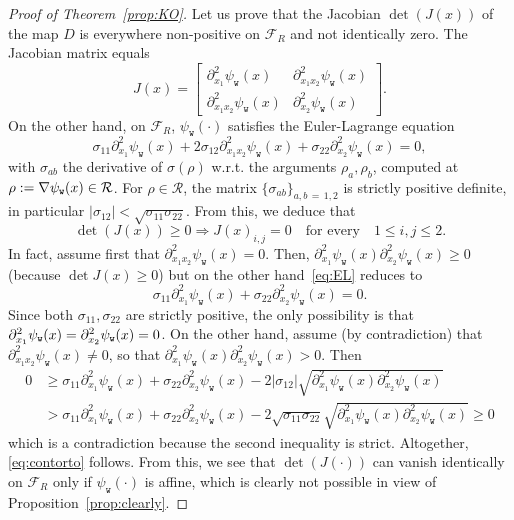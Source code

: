 \documentclass[10pt]{amsart}
\theoremstyle{definition}\newtheorem{defi}[theo]{Definition}\newtheorem{rema}[theo]{Remark}\newtheorem{exam}[theo]{Example}\newtheorem{exem}[theo]{Example}\newtheorem{nota}[theo]{Notation}
\newcommand{\ttw}{\mathtt{w}}
\newcommand{\clR}{\mathcal{R}}
\newcommand{\clF}{\mathcal{F}}
\begin{document}
\begin{proof}[Proof of Theorem~\ref{prop:KO}]
Let us prove that the Jacobian $\det(J(x))$ of the map $D $ is everywhere non-positive on $\clF_R$ and not identically zero. The Jacobian matrix equals
\begin{equation}\label{eq:J}
J(x)=
\begin{bmatrix}
\partial^2_{x_1}\psi_{\ttw}(x)&\partial^2_{x_1 x_2}\psi_{\ttw}(x)\\[0.10em]
\partial^2_{x_1 x_2}\psi_{\ttw}(x)&\partial^2_{x_2}\psi_{\ttw}(x)
\end{bmatrix}.
\end{equation}
On the other hand, on $\clF_R$, $\psi_{\ttw}(\cdot)$ satisfies the Euler-Lagrange equation
\begin{equation}\label{eq:EL}
\sigma_{11}\partial^2_{x_1}\psi_{\ttw}(x)+2 \sigma_{12} \partial^2_{x_1x_2}\psi_{\ttw}(x)+
\sigma_{22} \partial^2_{x_2}\psi_{\ttw}(x)=0,
\end{equation}
with $\sigma_{ab}$ the derivative of $\sigma(\rho)$ w.r.t. the arguments $\rho_a,\rho_b$, computed at $\rho:=\nabla\psi_{\ttw}(x)\linebreak\in\clR$. For $\rho\in \clR$, the matrix $\{\sigma_{ab}\}_{a,b\,=\,1,2}$ is strictly positive definite, in particular $|\sigma_{12}|<\sqrt{\sigma_{11}\sigma_{22}}$. From this, we deduce that
\begin{equation}\label{eq:contorto}
\det(J(x))\ge0\Rightarrow J(x)_{i,j}=0 \quad \text{for every} \quad 1\le i,j\le 2.
\end{equation}
In fact, assume first that $\partial^2_{x_1x_2}\psi_{\ttw}(x)=0$. Then, $\partial^2_{x_1}\psi_{\ttw}(x) \partial^2_{x_2}\psi_{\ttw}(x)\ge0$ (because $\det J(x)\ge0$) but on the other hand~\eqref{eq:EL} reduces to
\begin{equation}\label{eq:ELbis}
\sigma_{11}\partial^2_{x_1}\psi_{\ttw}(x)+
\sigma_{22} \partial^2_{x_2}\psi_{\ttw}(x)=0.
\end{equation}
Since both $\sigma_{11},\sigma_{22}$ are strictly positive, the only possibility is that $\partial^2_{x_1}\psi_{\ttw}(x)\linebreak= \partial^2_{x_2}\psi_{\ttw}(x)=0$. On the other hand, assume (by contradiction) that $\partial^2_{x_1x_2}\psi_{\ttw}(x)\ne0$, so that $\partial^2_{x_1}\psi_{\ttw}(x) \partial^2_{x_2}\psi_{\ttw}(x)>0$. Then
\begin{equation}\label{eq:contr}
\begin{aligned}
0 &\ge \sigma_{11}\partial^2_{x_1}\psi_{\ttw}(x)+\sigma_{22}\partial^2_{x_2}\psi_{\ttw}(x)-2 |\sigma_{12}|\sqrt{\partial^2_{x_1}\psi_{\ttw}(x)\partial^2_{x_2}\psi_{\ttw}(x)}\\
&> \sigma_{11}\partial^2_{x_1}\psi_{\ttw}(x)+\sigma_{22}\partial^2_{x_2}\psi_{\ttw}(x)-2 \sqrt{\sigma_{11}\sigma_{22}}\sqrt{\partial^2_{x_1}\psi_{\ttw}(x)\partial^2_{x_2}\psi_{\ttw}(x)}\ge0
\end{aligned}
\end{equation}
which is a contradiction because the second inequality is strict. Altogether, \eqref{eq:contorto} follows. From this, we see that $\det(J(\cdot))$ can vanish identically on $\clF_R$ only if $\psi_{\ttw}(\cdot)$ is affine, which is clearly not possible in view of Proposition~\ref{prop:clearly}.


\end{proof}
\end{document}
